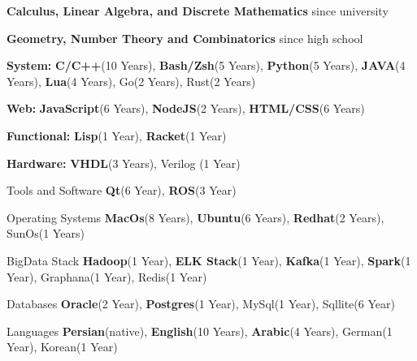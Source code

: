 




\begin{cvskills}

{
\begin{cvitems} %
      \item {\textbf{Calculus, Linear Algebra, and Discrete Mathematics} since university}
      \item {\textbf{Geometry, Number Theory and Combinatorics} since high school}
\end{cvitems}
}

{
\begin{cvitems}
      \item {\textbf{System: }\textbf{C/C++}(10 Years), \textbf{Bash/Zsh}(5 Years), \textbf{Python}(5 Years), \textbf{JAVA}(4 Years), \textbf{Lua}(4 Years), Go(2 Years), Rust(2 Years)}
      \item {\textbf{Web: }\textbf{JavaScript}(6 Years), \textbf{NodeJS}(2 Years), \textbf{HTML/CSS}(6 Years)}
      \item {\textbf{Functional: }\textbf{Lisp}(1 Year), \textbf{Racket}(1 Year)}
      \item {\textbf{Hardware: }\textbf{VHDL}(3 Years), Verilog (1 Year)}
\end{cvitems}
} %

  \cvskill
    {Tools and Software} %
    {\textbf{Qt}(6 Year), \textbf{ROS}(3 Year)} %

  \cvskill
    {Operating Systems} %
    {\textbf{MacOs}(8 Years), \textbf{Ubuntu}(6 Years), \textbf{Redhat}(2 Years), SunOs(1 Years)} %
    
  \cvskill
    {BigData Stack} %
    {\textbf{Hadoop}(1 Year), \textbf{ELK Stack}(1 Year), \textbf{Kafka}(1 Year), \textbf{Spark}(1 Year), Graphana(1 Year), Redis(1 Year)} %


  \cvskill
    {Databases} %
    {\textbf{Oracle}(2 Year), \textbf{Postgres}(1 Year), MySql(1 Year), Sqllite(6 Year)} %

  \cvskill
    {Languages} %
    {\textbf{Persian}(native), \textbf{English}(10 Years),  \textbf{Arabic}(4 Years), German(1 Year), Korean(1 Year)} %
\end{cvskills}
